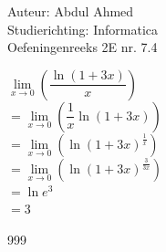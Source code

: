\documentclass[a4paper]{article}
\begin{document}
  
\noindent \large Auteur: Abdul Ahmed \\
\noindent \large Studierichting: Informatica\\
\noindent \large Oefeningenreeks 2E nr. 7.4\\

\medskip

\normalsize

$\lim\limits_{x \rightarrow 0} \left(\dfrac{\ln(1+3x)}{x}\right) $\\

$= \lim\limits_{x \rightarrow 0} \left(\dfrac{1}{x}{\ln(1+3x)}\right)$ \\

$= \lim\limits_{x \rightarrow 0} \left({\ln(1+3x)}^{\tfrac{1}{x}}\right)$ \\

$= \lim\limits_{x \rightarrow 0} \left({\ln(1+3x)}^{\tfrac{3}{3x}}\right)$ \\

$= \ln e^3$ \\

$= 3$\\

\begin{thebibliography}{999}
\end{thebibliography}
\end{document}
